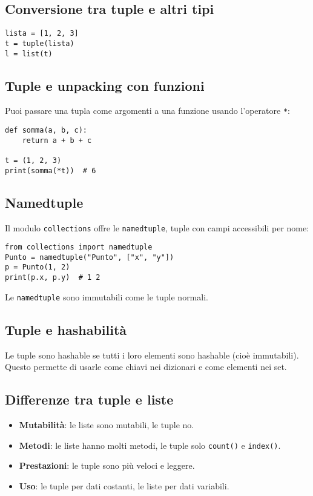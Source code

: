 \documentclass[a4paper,12pt]{article}
\begin{document}
\subsection*{Conversione tra tuple e altri tipi}
\begin{lstlisting}
lista = [1, 2, 3]
t = tuple(lista)
l = list(t)
\end{lstlisting}

\subsection*{Tuple e unpacking con funzioni}
Puoi passare una tupla come argomenti a una funzione usando l'operatore \texttt{*}:
\begin{lstlisting}
def somma(a, b, c):
    return a + b + c

t = (1, 2, 3)
print(somma(*t))  # 6
\end{lstlisting}

\subsection*{Namedtuple}
Il modulo \texttt{collections} offre le \texttt{namedtuple}, tuple con campi accessibili per nome:
\begin{lstlisting}
from collections import namedtuple
Punto = namedtuple("Punto", ["x", "y"])
p = Punto(1, 2)
print(p.x, p.y)  # 1 2
\end{lstlisting}
Le \texttt{namedtuple} sono immutabili come le tuple normali.

\subsection*{Tuple e hashabilità}
Le tuple sono hashable se tutti i loro elementi sono hashable (cioè immutabili). Questo permette di usarle come chiavi nei dizionari e come elementi nei set.

\subsection*{Differenze tra tuple e liste}
\begin{itemize}
    \item \textbf{Mutabilità}: le liste sono mutabili, le tuple no.
    \item \textbf{Metodi}: le liste hanno molti metodi, le tuple solo \texttt{count()} e \texttt{index()}.
    \item \textbf{Prestazioni}: le tuple sono più veloci e leggere.
    \item \textbf{Uso}: le tuple per dati costanti, le liste per dati variabili.
\end{itemize}
\end{document}
